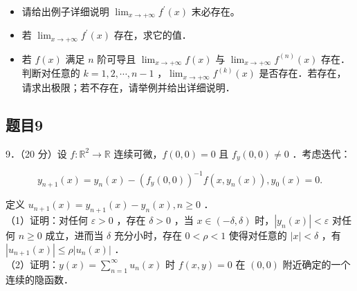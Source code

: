 \documentclass{article}
\begin{document}
\begin{itemize}
  \item[（1）] 请给出例子详细说明 \(\lim _{x \rightarrow+\infty} f^{\prime}(x)\) 末必存在。
  \item[（2）] 若 \(\lim _{x \rightarrow+\infty} f^{\prime}(x)\) 存在，求它的值．
  \item[（3）] 若 \(f(x)\) 满足 \(n\) 阶可导且 \(\lim _{x \rightarrow+\infty} f(x)\) 与 \(\lim _{x \rightarrow+\infty} f^{(n)}(x)\) 存在．判断对任意的 \(k=1,2, \cdots, n-1\) ，\(\lim _{x \rightarrow+\infty} f^{(k)}(x)\) 是否存在．若存在，请求出极限；若不存在，请举例并给出详细说明．
\end{itemize}

\subsection{题目9}
9．（20 分）设 \(f: \mathbb{R}^{2} \rightarrow \mathbb{R}\) 连续可微，\(f(0,0)=0\) 且 \(f_{y}(0,0) \neq 0\) ．考虑迭代：

\[
y_{n+1}(x)=y_{n}(x)-\left(f_{y}(0,0)\right)^{-1} f\left(x, y_{n}(x)\right), y_{0}(x)=0 .
\]

定义 \(u_{n+1}(x)=y_{n+1}(x)-y_{n}(x), n \geq 0\) ．\\
（1）证明：对任何 \(\varepsilon>0\) ，存在 \(\delta>0\) ，当 \(x \in(-\delta, \delta)\) 时，\(\left|y_{n}(x)\right|<\varepsilon\) 对任何 \(n \geq 0\) 成立，进而当 \(\delta\) 充分小时，存在 \(0<\rho<1\) 使得对任意的 \(|x|<\delta\) ，有 \(\left|u_{n+1}(x)\right| \leq \rho\left|u_{n}(x)\right|\) ．\\
（2）证明：\(y(x)=\sum_{n=1}^{\infty} u_{n}(x)\) 时 \(f(x, y)=0\) 在 \((0,0)\) 附近确定的一个连续的隐函数．
\end{document}
